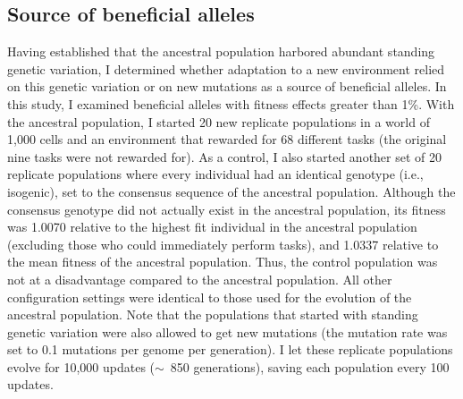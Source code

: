 \begin{doublespace}
\section{Source of beneficial alleles}



Having established that the ancestral population
harbored abundant standing genetic variation,
I determined whether adaptation to a new environment
relied on this genetic variation or on new mutations
as a source of beneficial alleles.
%
In this study, I examined beneficial alleles
with fitness effects greater than 1\%.
%
With the ancestral population,
I started 20 new replicate populations
in a world of 1,000 cells and an environment
that rewarded for 68 different tasks
(the original nine tasks were not rewarded for).
%
As a control,
I also started another set of 20 replicate populations
where every individual had an identical genotype (i.e., isogenic),
set to the consensus sequence of the ancestral population.
%
Although the consensus genotype did not actually exist
in the ancestral population,
its fitness was 1.0070 relative to the highest fit individual
in the ancestral population
(excluding those who could immediately perform tasks),
and 1.0337 relative to the mean fitness of the ancestral population.
%
Thus, the control population was not at a disadvantage
compared to the ancestral population.
%
All other configuration settings were identical
to those used for the evolution of the ancestral population.
%
Note that the populations that started with standing genetic variation
were also allowed to get new mutations
(the mutation rate was set to 0.1 mutations per genome per generation).
%
I let these replicate populations
evolve for 10,000 updates ($\sim$~850 generations),
saving each population every 100 updates.






\end{doublespace}
